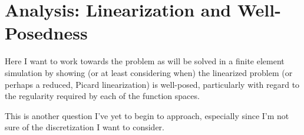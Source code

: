 \section{Analysis: Linearization and Well-Posedness}\label{cha:analysis}
    \begin{remark}
        Here I want to work towards the problem as will be solved in a finite element simulation by showing (or at least considering when) the linearized problem (or perhaps a reduced, Picard linearization) is well-posed, particularly with regard to the regularity required by each of the function spaces.
        
        This is another question I've yet to begin to approach, especially since I'm not sure of the discretization I want to consider.
    \end{remark}
